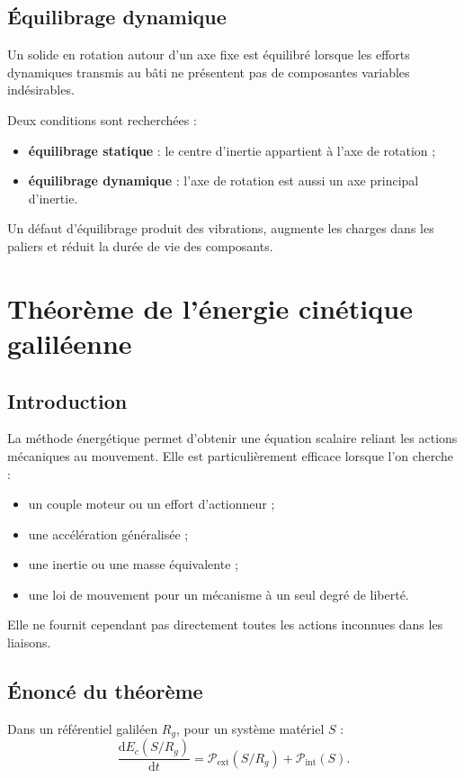 \subsection{Équilibrage dynamique}

Un solide en rotation autour d'un axe fixe est équilibré lorsque les efforts dynamiques transmis au bâti ne présentent pas de composantes variables indésirables.

Deux conditions sont recherchées :
\begin{itemize}
  \item \textbf{équilibrage statique} : le centre d'inertie appartient à l'axe de rotation ;
  \item \textbf{équilibrage dynamique} : l'axe de rotation est aussi un axe principal d'inertie.
\end{itemize}

Un défaut d'équilibrage produit des vibrations, augmente les charges dans les paliers et réduit la durée de vie des composants.

\section{Théorème de l'énergie cinétique galiléenne}

\subsection{Introduction}

La méthode énergétique permet d'obtenir une équation scalaire reliant les actions mécaniques au mouvement. Elle est particulièrement efficace lorsque l'on cherche :
\begin{itemize}
  \item un couple moteur ou un effort d'actionneur ;
  \item une accélération généralisée ;
  \item une inertie ou une masse équivalente ;
  \item une loi de mouvement pour un mécanisme à un seul degré de liberté.
\end{itemize}

Elle ne fournit cependant pas directement toutes les actions inconnues dans les liaisons.

\subsection{Énoncé du théorème}

Dans un référentiel galiléen $R_g$, pour un système matériel $S$ :
\[
\frac{\mathrm d E_c(S/R_g)}{\mathrm dt}
=\mathcal P_{\mathrm{ext}}(S/R_g)
+\mathcal P_{\mathrm{int}}(S).
\]


